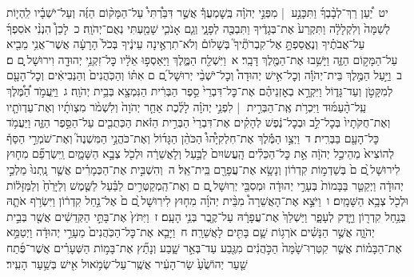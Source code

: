 \documentclass[18pt]{article}
\begin{document}
 {\loc יט~}יַ֠עַן רַךְ־לְבָ֨בְךָ֜ וַתִּכָּנַ֣ע  |  מִפְּנֵ֣י יְהֹוָ֗ה בְּֽשׇׁמְעֲךָ֡ אֲשֶׁ֣ר דִּבַּ֩רְתִּי֩ עַל־הַמָּק֨וֹם הַזֶּ֜ה וְעַל־יֹשְׁבָ֗יו לִֽהְי֤וֹת לְשַׁמָּה֙ וְלִקְלָלָ֔ה וַתִּקְרַע֙ אֶת־בְּגָדֶ֔יךָ וַתִּבְכֶּ֖ה לְפָנָ֑י וְגַ֧ם אָנֹכִ֛י שָׁמַ֖עְתִּי נְאֻם־יְהֹוָֽה׃ \startlock
 {\loc כ~}לָכֵן֩ הִנְנִ֨י אֹסִפְךָ֜ עַל־אֲבֹתֶ֗יךָ וְנֶאֱסַפְתָּ֣ אֶל־קִבְרֹתֶ֘יךָ֮ בְּשָׁלוֹם֒ וְלֹא־תִרְאֶ֣ינָה עֵינֶ֔יךָ בְּכֹל֙ הָרָעָ֔ה אֲשֶׁר־אֲנִ֥י מֵבִ֖יא עַל־הַמָּק֣וֹם הַזֶּ֑ה וַיָּשִׁ֥בוּ אֶת־הַמֶּ֖לֶךְ דָּבָֽר׃ 
\startlock
 {\loc א~}וַיִּשְׁלַ֖ח הַמֶּ֑לֶךְ וַיַּאַסְפ֣וּ אֵלָ֔יו כׇּל־זִקְנֵ֥י יְהוּדָ֖ה וִירוּשָׁל ָֽ͏ְם ם׃ \startlock
 {\loc ב~}וַיַּ֣עַל הַמֶּ֣לֶךְ בֵּית־יְהֹוָ֡ה וְכׇל־אִ֣ישׁ יְהוּדָה֩ וְכׇל־יֹשְׁבֵ֨י יְרוּשָׁל ַ֜͏ְם ם אִתּ֗וֹ וְהַכֹּֽהֲנִים֙ וְהַנְּבִיאִ֔ים וְכׇל־הָעָ֖ם לְמִקָּטֹ֣ן וְעַד־גָּד֑וֹל וַיִּקְרָ֣א בְאׇזְנֵיהֶ֗ם אֶת־כׇּל־דִּבְרֵי֙ סֵ֣פֶר הַבְּרִ֔ית הַנִּמְצָ֖א בְּבֵ֥ית יְהֹוָֽה׃ \startlock
 {\loc ג~}וַיַּֽעֲמֹ֣ד הַ֠מֶּ֠לֶךְ עַֽל־הָ֨עַמּ֜וּד וַיִּכְרֹ֥ת אֶֽת־הַבְּרִ֣ית  |  לִפְנֵ֣י יְהֹוָ֗ה לָלֶ֜כֶת אַחַ֤ר יְהֹוָה֙ וְלִשְׁמֹ֨ר מִצְוֺתָ֜יו וְאֶת־עֵדְוֺתָ֤יו וְאֶת־חֻקֹּתָיו֙ בְּכׇל־לֵ֣ב וּבְכׇל־נֶ֔פֶשׁ לְהָקִ֗ים אֶת־דִּבְרֵי֙ הַבְּרִ֣ית הַזֹּ֔את הַכְּתֻבִ֖ים עַל־הַסֵּ֣פֶר הַזֶּ֑ה וַיַּעֲמֹ֥ד כׇּל־הָעָ֖ם בַּבְּרִֽית׃ \startlock
 {\loc ד~}וַיְצַ֣ו הַמֶּ֡לֶךְ אֶת־חִלְקִיָּ֩הוּ֩ הַכֹּהֵ֨ן הַגָּד֜וֹל וְאֶת־כֹּהֲנֵ֣י הַמִּשְׁנֶה֮ וְאֶת־שֹׁמְרֵ֣י הַסַּף֒ לְהוֹצִיא֙ מֵהֵיכַ֣ל יְהֹוָ֔ה אֵ֣ת כׇּל־הַכֵּלִ֗ים הָֽעֲשׂוּיִם֙ לַבַּ֣עַל וְלָאֲשֵׁרָ֔ה וּלְכֹ֖ל צְבָ֣א הַשָּׁמָ֑יִם וַֽיִּשְׂרְפֵ֞ם מִח֤וּץ לִירוּשָׁל ַ֙͏ְם ם֙ בְּשַׁדְמ֣וֹת קִדְר֔וֹן וְנָשָׂ֥א אֶת־עֲפָרָ֖ם בֵּֽית־אֵֽל׃ \startlock
 {\loc ה~}וְהִשְׁבִּ֣ית אֶת־הַכְּמָרִ֗ים אֲשֶׁ֤ר נָֽתְנוּ֙ מַלְכֵ֣י יְהוּדָ֔ה וַיְקַטֵּ֤ר בַּבָּמוֹת֙ בְּעָרֵ֣י יְהוּדָ֔ה וּמְסִבֵּ֖י יְרֽוּשָׁל ָ֑͏ְם ם וְאֶת־הַֽמְקַטְּרִ֣ים לַבַּ֗עַל לַשֶּׁ֤מֶשׁ וְלַיָּרֵ֙חַ֙ וְלַמַּזָּל֔וֹת וּלְכֹ֖ל צְבָ֥א הַשָּׁמָֽיִם׃ \startlock
 {\loc ו~}וַיֹּצֵ֣א אֶת־הָאֲשֵׁרָה֩ מִבֵּ֨ית יְהֹוָ֜ה מִח֤וּץ לִירֽוּשָׁל ַ֙͏ְם ם֙ אֶל־נַ֣חַל קִדְר֔וֹן וַיִּשְׂרֹ֥ף אֹתָ֛הּ בְּנַ֥חַל קִדְר֖וֹן וַיָּ֣דֶק לְעָפָ֑ר וַיַּשְׁלֵךְ֙ אֶת־עֲפָרָ֔הּ עַל־קֶ֖בֶר בְּנֵ֥י הָעָֽם׃ \startlock
 {\loc ז~}וַיִּתֹּץ֙ אֶת־בָּתֵּ֣י הַקְּדֵשִׁ֔ים אֲשֶׁ֖ר בְּבֵ֣ית יְהֹוָ֑ה אֲשֶׁ֣ר הַנָּשִׁ֗ים אֹרְג֥וֹת שָׁ֛ם בָּתִּ֖ים לָאֲשֵׁרָֽה׃ \startlock
 {\loc ח~}וַיָּבֵ֤א אֶת־כׇּל־הַכֹּֽהֲנִים֙ מֵעָרֵ֣י יְהוּדָ֔ה וַיְטַמֵּ֣א אֶת־הַבָּמ֗וֹת אֲשֶׁ֤ר קִטְּרֽוּ־שָׁ֙מָּה֙ הַכֹּ֣הֲנִ֔ים מִגֶּ֖בַע עַד־בְּאֵ֣ר שָׁ֑בַע וְנָתַ֞ץ אֶת־בָּמ֣וֹת הַשְּׁעָרִ֗ים אֲשֶׁר־פֶּ֜תַח שַׁ֤עַר יְהוֹשֻׁ֙עַ֙ שַׂר־הָעִ֔יר אֲשֶֽׁר־עַל־שְׂמֹ֥אול אִ֖ישׁ בְּשַׁ֥עַר הָעִֽיר׃ \startlock
\end{document}
